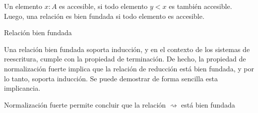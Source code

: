 Un elemento $x: A$ es accesible, si todo elemento $y < x$ es también accesible.
Luego, una relación es bien fundada si todo elemento es accesible.

\begin{codigo}
	Relación bien fundada
\end{codigo}

Una relación bien fundada soporta inducción, y en el contexto de los sistemas de reescritura, cumple con la propiedad de terminación.
De hecho, la propiedad de normalización fuerte implica que la relación de reducción está bien fundada, y por lo tanto, soporta inducción.
Se puede demostrar de forma sencilla esta implicancia.

\begin{codigo}
	Normalización fuerte permite concluir que la relación $\rightsquigarrow$ está bien fundada
\end{codigo} 
